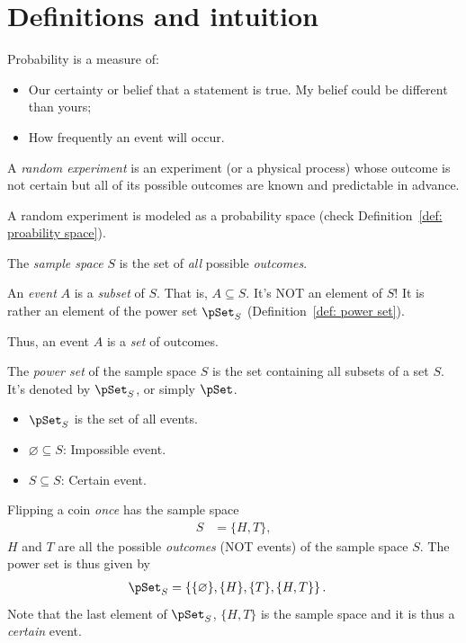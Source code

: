 
\section{Definitions and intuition}
Probability is a measure of:
\begin{itemize}
    \item Our certainty or belief that a statement is true. My belief could be different than yours;
    \item How frequently an event will occur.
\end{itemize}
\begin{mydefinition}
        A \emph{random experiment} is an experiment (or a physical process) whose outcome is not certain but all of its possible outcomes are known and predictable in advance.        

        A random experiment is modeled as a probability space (check Definition~\ref{def: proability space}).
\end{mydefinition}
\begin{mydefinition}
    The \emph{sample space} $S$ is the set of \emph{all} possible \emph{outcomes}.
\end{mydefinition}

\begin{mydefinition}[Event]
    An \emph{event} $A$ is a \emph{subset} of $S$. That is, $A\subseteq S$. It's NOT an element of $S$! It is rather an element of the power set $\pSet_{S}$ (Definition~\ref{def: power set}).

    Thus, an event $A$ is a \emph{set} of outcomes. 
\end{mydefinition}
\begin{mydefinition}
    \label{def: power set}
    The \emph{power set} of the sample space $S$ is the set containing all subsets of a set $S$. It's denoted by $\pSet_{S}$, or simply $\pSet$.
    \thline
    \begin{itemize}
        \item $\pSet_{S}$ is the set of all events.
        \item $\varnothing \subseteq S$: Impossible event.
        \item $S \subseteq S$: Certain event.
    \end{itemize}
\end{mydefinition}
\begin{example}
    Flipping a coin \emph{once} has the sample space
    \begin{align}
        S &= \{H, T\},
    \end{align}
    $H$ and $T$ are all the possible \emph{outcomes} (NOT events) of the sample space $S$. The power set is thus given by
    \begin{align}
        \pSet_{S} &= \left\{\{\varnothing\}, \{H\}, \{T\}, \{H,T\}\right\}.
    \end{align}
    Note that the last element of $\pSet_{S}$, $\{H,T\}$ is the sample space and it is thus a \emph{certain} event. 
    \triqed
\end{example}

